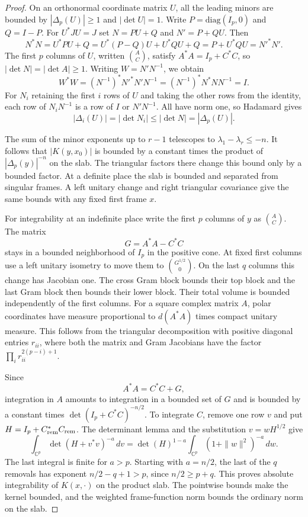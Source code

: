 \begin{proof}
On an orthonormal coordinate matrix \(U\), all the
leading minors are bounded by \(|\Delta_p(U)|\ge1\)
and \(|\det U|=1\). Write \(P=\mathrm{diag}(I_p,0)\) and \(Q=I-P\).
For \(U^*JU=J\) set \(N=PU+Q\) and \(N'=P+QU\).
Then
\[
 N^*N=U^*PU+Q=U^*(P-Q)U+U^*QU+Q=P+U^*QU=N'^*N'.
\]
The first
\(p\) columns of \(U\), written \(\binom{A}{C}\), satisfy
\(A^*A=I_p+C^*C\), so \(|\det N|=|\det A|\ge1\).
Writing \(W=N'N^{-1}\), we obtain
\[
 W^*W=(N^{-1})^*N'^*N'N^{-1}=(N^{-1})^*N^*NN^{-1}=I .
\] For \(N_i\) retaining the first
\(i\) rows of \(U\) and taking the other rows from the identity,
each row of \(N_iN^{-1}\) is a row of \(I\) or \(N'N^{-1}\).
All have norm one, so Hadamard gives
\[
      |\Delta_i(U)|=|\det N_i|\le|\det N|=|\Delta_p(U)|.
\]

The sum of the minor exponents up to \(r-1\) telescopes
to \(\lambda_1-\lambda_r\le-n\).
It follows that \(|K(y,x_0)|\) is bounded by a
constant times the product of \(|\Delta_p(y)|^{-n}\)
on the slab. The triangular factors there change
this bound only by a bounded factor. At a definite
place the slab is bounded and separated from singular
frames. A left unitary change and right triangular
covariance give the same bounds with any fixed first
frame \(x\).

For integrability at an indefinite place write the
first \(p\) columns of \(y\) as \(\binom{A}{C}\).
The matrix
\[
 G=A^*A-C^*C
\]
stays in a bounded
neighborhood of \(I_p\) in the positive cone.
At fixed first columns use a left unitary isometry
to move them to \(\binom{G^{1/2}}{0}\). On the last
\(q\) columns this change has Jacobian one. The
cross Gram block bounds their top block and the
last Gram block then bounds their lower block.
Their total volume is bounded independently of
the first columns. For a square complex matrix \(A\),
polar coordinates have measure proportional to
\(d(A^*A)\) times compact unitary measure. This follows
from the triangular decomposition with positive
diagonal entries \(r_{ii}\), where both the matrix
and Gram Jacobians have the factor
\(\prod_i r_{ii}^{2(p-i)+1}\).

Since
\[
 A^*A=C^*C+G,
\]
integration in \(A\) amounts
to integration in a bounded set of \(G\) and is bounded
by a constant times \(\det(I_p+C^*C)^{-n/2}\).
To integrate \(C\), remove one row \(v\) and put
\(H=I_p+C_{\rm rem}^*C_{\rm rem}\). The determinant lemma
and the substitution \(v=wH^{1/2}\) give
\[
 \int_{\mathbb C^p}\det(H+v^*v)^{-a}\,dv
    =\det(H)^{1-a}
          \int_{\mathbb C^p}(1+\|w\|^2)^{-a}\,dw .
\]
The last integral is finite for \(a>p\). Starting with
\(a=n/2\), the last of the \(q\) removals has exponent
\(n/2-q+1>p\), since \(n/2\ge p+q\).
This proves absolute integrability of \(K(x,\cdot)\) on the
product slab. The pointwise bounds make the kernel bounded,
and the weighted frame-function norm bounds the ordinary norm
on the slab.



\end{proof}
